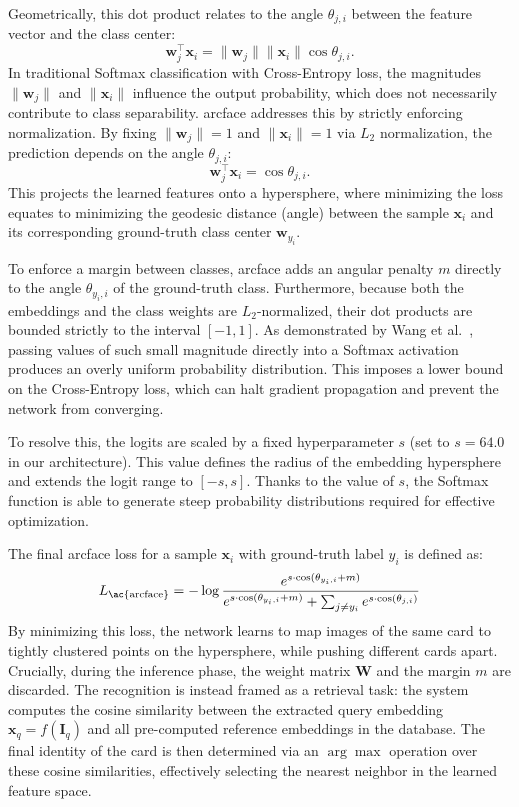Geometrically, this dot product relates to the angle $\theta_{j,i}$ between the feature vector and the class center:
\begin{equation}
   \mathbf{w}_j^\intercal \mathbf{x}_i = \|\mathbf{w}_j\| \|\mathbf{x}_i\| \cos \theta_{j,i}.
\end{equation}
In traditional Softmax classification with Cross-Entropy loss, the magnitudes $\|\mathbf{w}_j\|$ and $\|\mathbf{x}_i\|$ influence the output probability, which does not necessarily contribute to class separability. \ac{arcface} addresses this by strictly enforcing normalization. By fixing $\|\mathbf{w}_j\| = 1$ and $\|\mathbf{x}_i\| = 1$ via $L_2$ normalization, the prediction depends  on the angle $\theta_{j,i}$:
\begin{equation}
    \mathbf{w}_j^\intercal \mathbf{x}_i = \cos \theta_{j,i}.
\end{equation}
This projects the learned features onto a hypersphere, where minimizing the loss equates to minimizing the geodesic distance (angle) between the sample $\mathbf{x}_i$ and its corresponding ground-truth class center $\mathbf{w}_{y_i}$.


To enforce a margin between classes, \ac{arcface} adds an angular penalty $m$ directly to the angle $\theta_{y_i, i}$ of the ground-truth class. Furthermore, because both the embeddings and the class weights are $L_2$-normalized, their dot products are bounded strictly to the interval $[-1, 1]$. As demonstrated by Wang et al.~\cite{wang2017normface}, passing values of such small magnitude directly into a Softmax activation produces an overly uniform probability distribution. This imposes a lower bound on the Cross-Entropy loss, which can halt gradient propagation and prevent the network from converging. 

\label{sub:geometric_s}
To resolve this, the logits are scaled by a fixed hyperparameter $s$ (set to $s=64.0$ in our architecture). This value defines the radius of the embedding hypersphere and extends the logit range to $[-s, s]$. Thanks to the value of $s$, the Softmax function is able to generate steep probability distributions required for effective optimization.

The final \ac{arcface} loss for a sample $\mathbf{x}_i$ with ground-truth label $y_i$ is defined as:
\begin{equation}
    L_{\text{\ac{arcface}}} = -\log \frac{e^{s \cdot \cos(\theta_{y_i, i} + m)}}{e^{s \cdot \cos(\theta_{y_i, i} + m)} + \sum_{j \neq y_i} e^{s \cdot \cos(\theta_{j, i})}}
\end{equation}
By minimizing this loss, the network learns to map images of the same card to tightly clustered points on the hypersphere, while pushing different cards apart. Crucially, during the inference phase, the weight matrix $\mathbf{W}$ and the margin $m$ are discarded. The recognition is instead framed as a retrieval task: the system computes the cosine similarity between the extracted query embedding $\mathbf{x}_q = f(\mathbf{I}_q)$ and all pre-computed reference embeddings in the database. The final identity of the card is then determined via an $\arg\max$ operation over these cosine similarities, effectively selecting the nearest neighbor in the learned feature space.

